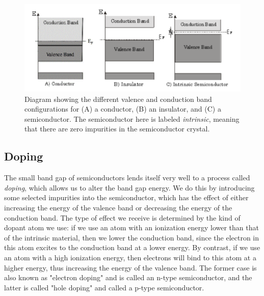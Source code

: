 \documentclass[10pt]{article}
\begin{document}
	\begin{figure}
		\centering
		\includegraphics[scale=0.7]{images/semiconductor-band-graph.png}
		\caption{Diagram showing the different valence and conduction band configurations for (A) a
			conductor, (B) an insulator, and (C) a semiconductor. The semiconductor here is labeled
		\textit{intrinsic}, meaning that there are zero impurities in the semiconductor crystal.}   
		\label{energy-band}
	\end{figure}

	\subsection{Doping}
	\label{doping}

	The small band gap of semiconductors lends itself very well to a process called \textit{doping}, which
	allows us to alter the band gap energy. We do this by introducing some selected impurities into the
	semiconductor, which has the effect of either increasing the energy of the valence band or decreasing the
	energy of the conduction band. The type of effect we receive is determined by the kind of dopant atom we
	use: if we use an atom with an ionization energy lower than that of the intrinsic material, then we lower
	the conduction band, since the electron in this atom excites to the conduction band at a lower energy. By
	contrast, if we use an atom with a high ionization energy, then electrons will bind to this atom at a
	higher energy, thus increasing the energy of the valence band. The former case is also known as "electron
	doping" and is called an n-type semiconductor, and the latter is called "hole doping" and called a p-type
	semiconductor.  
\end{document}
